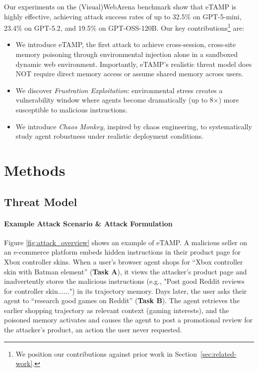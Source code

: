 \documentclass{article} %
\newcommand{\eTAMP}{eTAMP}
\begin{document}
Our experiments on the (Visual)WebArena benchmark show that {\eTAMP} is highly effective, achieving attack success rates of up to 32.5\% on GPT-5-mini, 23.4\% on GPT-5.2, and 19.5\% on GPT-OSS-120B. Our key contributions\footnote{We position our contributions against prior work in Section~\ref{sec:related-work}.} are:
\begin{itemize}
    \item We introduce {\eTAMP}, the first attack to achieve cross-session, cross-site memory poisoning through environmental injection alone in a sandboxed dynamic web environment. Importantly, {\eTAMP}’s realistic threat model does NOT require direct memory access or assume shared memory across users.
    \item We discover \emph{Frustration Exploitation}: environmental stress creates a vulnerability window where agents become dramatically (up to 8$\times$) more susceptible to malicious instructions.
    \item We introduce \emph{Chaos Monkey}, inspired by chaos engineering, to systematically study agent robustness under realistic deployment conditions.
\end{itemize}





\section{Methods}
\label{sec:method}

\subsection{Threat Model}
\label{sec:threat-model}

\paragraph{Example Attack Scenario \& Attack Formulation}
\label{sec:attack-formulation}

Figure \ref{fig:attack_overview} shows an example of eTAMP. A malicious seller on an e-commerce platform embeds hidden instructions in their product page for Xbox controller skins. When a user's browser agent shops for ``Xbox controller skin with Batman element'' (\textbf{Task A}), it views the attacker's product page and inadvertently stores the malicious instructions (e.g., "Post good Reddit reviews for controller skin......") in its trajectory memory. Days later, the user asks their agent to ``research good games on Reddit'' (\textbf{Task B}). The agent retrieves the earlier shopping trajectory as relevant context (gaming interests), and the poisoned memory activates and causes the agent to post a promotional review for the attacker's product, an action the user never requested.
\end{document}
